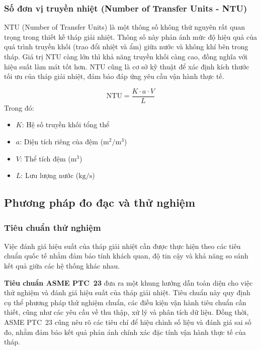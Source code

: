 \documentclass[../main.tex]{subfiles}
\begin{document}
\subsubsection{Số đơn vị truyền nhiệt (Number of Transfer Units - NTU)}
NTU (Number of Transfer Units) là một thông số không thứ nguyên rất quan trọng trong thiết kế tháp giải nhiệt. Thông số này phản ánh mức độ hiệu quả của quá trình truyền khối (trao đổi nhiệt và ẩm) giữa nước và không khí bên trong tháp. Giá trị NTU càng lớn thì khả năng truyền khối càng cao, đồng nghĩa với hiệu suất làm mát tốt hơn. NTU cũng là cơ sở kỹ thuật để xác định kích thước tối ưu của tháp giải nhiệt, đảm bảo đáp ứng yêu cầu vận hành thực tế.

\begin{equation}
    \text{NTU} = \frac{K \cdot a \cdot V}{L}
\end{equation}
Trong đó:
\begin{itemize}
    \item $K$: Hệ số truyền khối tổng thể
    \item $a$: Diện tích riêng của đệm ($\mathrm{m^2/m^3}$)
    \item $V$: Thể tích đệm ($\mathrm{m^3}$)
    \item $L$: Lưu lượng nước ($\mathrm{kg/s}$)
\end{itemize}

\subsection{Phương pháp đo đạc và thử nghiệm}
\label{sec:measurement_testing_methods}

\subsubsection{Tiêu chuẩn thử nghiệm}

Việc đánh giá hiệu suất của tháp giải nhiệt cần được thực hiện theo các tiêu chuẩn quốc tế nhằm đảm bảo tính khách quan, độ tin cậy và khả năng so sánh kết quả giữa các hệ thống khác nhau. 

\textbf{Tiêu chuẩn ASME PTC~23} \cite{ashrae2020cooling} đưa ra một khung hướng dẫn toàn diện cho việc thử nghiệm và đánh giá hiệu suất của tháp giải nhiệt. Tiêu chuẩn này quy định cụ thể phương pháp thử nghiệm chuẩn, các điều kiện vận hành tiêu chuẩn cần thiết, cũng như các yêu cầu về thu thập, xử lý và phân tích dữ liệu. Đồng thời, ASME PTC~23 cũng nêu rõ các tiêu chí để hiệu chỉnh số liệu và đánh giá sai số đo, nhằm đảm bảo kết quả phản ánh chính xác đặc tính vận hành thực tế của tháp.
\end{document}
